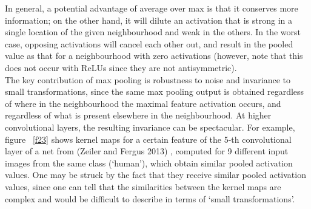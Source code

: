 \documentclass[a4paper,11pt]{article}
\begin{document}
In general, a potential advantage of average over max is that it conserves more information; on the other hand, it will dilute an activation that is strong in a single location of the given neighbourhood and weak in the others. In the worst case, opposing activations will cancel each other out, and result in the pooled value as that for a neighbourhood with zero activations (however, note that this does not occur with ReLUs since they are not antisymmetric). \\

The key contribution of max pooling is robustness to noise and invariance to small transformations, since the same max pooling output is obtained regardless of where in the neighbourhood the maximal feature activation occurs, and regardless of what is present elsewhere in the neighbourhood. At higher convolutional layers, the resulting invariance can be spectacular. For example, figure ~\ref{f23} shows kernel maps for a certain feature of the 5-th convolutional layer of a net from (Zeiler and Fergus 2013) \cite{zeiler_fergus}, computed for 9 different input images from the same class (`human'), which obtain similar pooled activation values. One may be struck by the fact that they receive similar pooled activation values, since one can tell that the similarities between the kernel maps are complex and would be difficult to describe in terms of `small transformations'. \\
\end{document}
